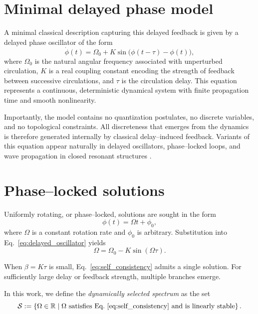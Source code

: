 \documentclass[pdflatex,sn-mathphys-num]{sn-jnl}
\begin{document}
    \section{Minimal delayed phase model}
        A minimal classical description capturing this delayed feedback is given by a delayed phase oscillator of the form
        \begin{equation}
            \dot{\phi}(t) = \Omega_0 + K \sin\big(\phi(t-\tau) - \phi(t)\big),
            \label{eq:delayed_oscillator}
        \end{equation}
        where $\Omega_0$ is the natural angular frequency associated with unperturbed circulation, $K$ is a real coupling constant encoding the strength of feedback between successive circulations, and $\tau$ is the circulation delay. This equation represents a continuous, deterministic dynamical system with finite propagation time and smooth nonlinearity.

        Importantly, the model contains no quantization postulates, no discrete variables, and no topological constraints. All discreteness that emerges from the dynamics is therefore generated internally by classical delay--induced feedback. Variants of this equation appear naturally in delayed oscillators, phase--locked loops, and wave propagation in closed resonant structures \cite{Erneux2009,Earl2003,Gardner2005,Ikeda1979}.

    \section{Phase--locked solutions}

        Uniformly rotating, or phase--locked, solutions are sought in the form
        \begin{equation}
            \phi(t) = \Omega t + \phi_0,
            \label{eq:ansatz}
        \end{equation}
        where $\Omega$ is a constant rotation rate and $\phi_0$ is arbitrary.
        Substitution into Eq.~\ref{eq:delayed_oscillator} yields
        \begin{equation}
            \Omega = \Omega_0 - K \sin(\Omega\tau).
            \label{eq:self_consistency}
        \end{equation}

        When $\beta=K\tau$ is small, Eq.~\ref{eq:self_consistency} admits a single solution.
        For sufficiently large delay or feedback strength, multiple branches emerge.

        In this work, we define the \emph{dynamically selected spectrum} as the set
        \begin{equation}
            \mathcal{S} :=
            \left\{
            \Omega \in \mathbb{R} \;\middle|\;
            \Omega \text{ satisfies Eq.~\ref{eq:self_consistency} and is linearly stable}
            \right\}.
            \label{eq:frequency_set}
        \end{equation}
\end{document}
